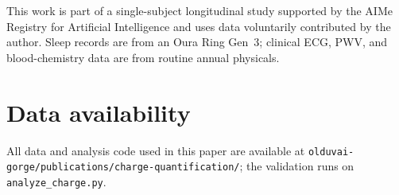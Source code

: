 \documentclass[11pt,twocolumn,a4paper]{article}
\theoremstyle{definition}
\theoremstyle{remark}
\begin{document}
This work is part of a single-subject longitudinal study supported by
the AIMe Registry for Artificial Intelligence and uses data
voluntarily contributed by the author. Sleep records are from an
Oura Ring Gen~3; clinical ECG, PWV, and blood-chemistry data are
from routine annual physicals.

\section*{Data availability}

All data and analysis code used in this paper are available at
\texttt{olduvai-gorge/publications/charge-quantification/}; the
validation runs on \texttt{analyze\_charge.py}.



\end{document}
